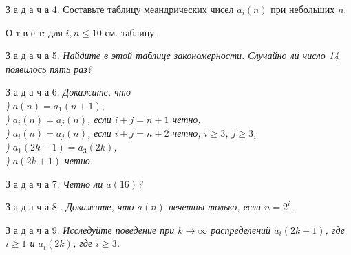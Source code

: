 \documentclass[Main.tex]{subfiles}
\begin{document}
\begin{multicols}{2}
З а д а ч а 4. Составьте таблицу меандрических чисел $a_i(n)$ при небольших $n$.

О т в е т: для $i,n \leq 10$ см. таблицу.

\begin{center}
\end{center}

З а д а ч а 5. \textit{Найдите в этой таблице закономерности. Случайно ли число 14 появилось пять раз?}

З а д а ч а 6. \textit{Докажите, что\\
) $a(n) = a_1(n+1),$\\
) $a_i(n) =  a_j(n)$, если $i + j = n + 1$ четно,\\
) $a_i(n) = a_j(n)$, если $i + j = n + 2$ четно, $i \geq 3$, $j \geq 3$,\\
) $a_1(2k-1) = a_3(2k)$,\\
) $a(2k+1)$ четно.\\
}

З а д а ч а 7. \textit{Четно ли $a(16)$?}

З а д а ч а 8 . \textit{Докажите, что $a(n)$ нечетны только, если $n = 2^i$.}

З а д а ч а 9. \textit{Исследуйте поведение при $k \rightarrow \infty$ распределений $a_i(2k + 1)$, где $i \geq 1$ и $a_i(2k)$, где $i \geq 3$.}


\end{multicols}
\end{document}

